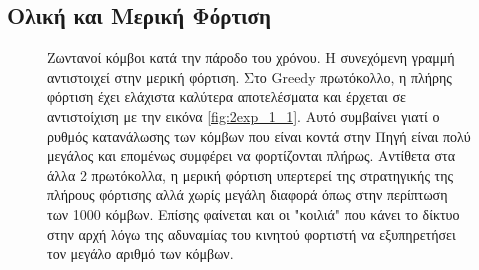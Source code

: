 \subsection{Ολική και Μερική Φόρτιση}\label{subc:result6_2}
\begin{figure}[H]
  \centering
  \caption{Ζωντανοί κόμβοι κατά την πάροδο του χρόνου. Η συνεχόμενη γραμμή αντιστοιχεί στην μερική φόρτιση. Στο Greedy πρωτόκολλο, η πλήρης φόρτιση έχει
ελάχιστα καλύτερα αποτελέσματα και έρχεται σε αντιστοίχιση με την εικόνα \ref{fig:2exp_1_1}. Αυτό συμβαίνει γιατί ο ρυθμός κατανάλωσης των κόμβων που είναι κοντά
στην Πηγή είναι πολύ μεγάλος και επομένως συμφέρει να φορτίζονται πλήρως. Αντίθετα στα άλλα 2 πρωτόκολλα, η μερική φόρτιση υπερτερεί της στρατηγικής της πλήρους
φόρτισης αλλά χωρίς μεγάλη διαφορά όπως στην περίπτωση των 1000 κόμβων. Επίσης φαίνεται και οι "κοιλιά" που κάνει το δίκτυο στην αρχή λόγω της αδυναμίας του κινητού
φορτιστή να εξυπηρετήσει τον μεγάλο αριθμό των κόμβων.}
  \label{fig:5_2exp_1_1}
\end{figure}

